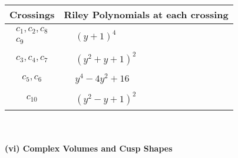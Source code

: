 \documentclass[1p]{elsarticle_modified}
\theoremstyle{definition}
\begin{document}
\begin{tabular}{m{50pt}|m{274pt}}
Crossings & \hspace{64pt}Riley Polynomials at each crossing \\
\hline $$\begin{aligned}c_{1},c_{2},c_{8}\\c_{9}\end{aligned}$$&$\begin{aligned}
&(y+1)^4
\end{aligned}$\\
\hline $$\begin{aligned}c_{3},c_{4},c_{7}\end{aligned}$$&$\begin{aligned}
&(y^2+y+1)^2
\end{aligned}$\\
\hline $$\begin{aligned}c_{5},c_{6}\end{aligned}$$&$\begin{aligned}
&y^4-4 y^2+16
\end{aligned}$\\
\hline $$\begin{aligned}c_{10}\end{aligned}$$&$\begin{aligned}
&(y^2- y+1)^2
\end{aligned}$\\
\hline
\end{tabular}\\~\\
\newpage\flushleft \textbf{(vi) Complex Volumes and Cusp Shapes}
\end{document}
